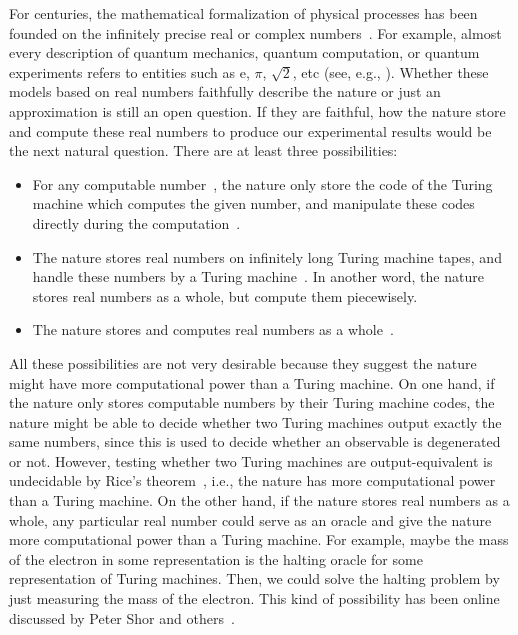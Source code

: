 \documentclass{article}
\theoremstyle{remark}
\newcommand{\rme}{\mathrm{e}}
\begin{document}
For centuries, the mathematical formalization of physical processes
has been founded on the infinitely precise real or complex
numbers~\cite{Ziegler2007,weihrauch2012computable,blum2012complexity}.
For example, almost every description of quantum mechanics, quantum
computation, or quantum experiments refers to entities such as $\rme$,
$\pi$, $\sqrt{2}$, etc (see, e.g.,
\cite{Redhead1987-REDINA,544199,Mermin2007}).  Whether these models
based on real numbers faithfully describe the nature or just an
approximation is still an open question. If they are faithful, how the
nature store and compute these real numbers to produce our
experimental results would be the next natural question.  There are at
least three possibilities:
\begin{itemize}
\item For any computable number~\cite{Turing_1937}, the nature only store
the code of the Turing machine which computes the given number, and
manipulate these codes directly during the computation~\cite{Ziegler2007,weihrauch2012computable}.
\item The nature stores real numbers on infinitely long Turing machine tapes,
and handle these numbers by a Turing machine~\cite{Ziegler2007,weihrauch2012computable}.
In another word, the nature stores real numbers as a whole, but compute
them piecewisely.
\item The nature stores and computes real numbers as a whole~\cite{Ziegler2007,blum2012complexity}.
\end{itemize}
All these possibilities are not very desirable because they suggest
the nature might have more computational power than a Turing machine.
On one hand, if the nature only stores computable numbers by their
Turing machine codes, the nature might be able to decide whether two
Turing machines output exactly the same numbers, since this is used
to decide whether an observable is degenerated or not. However, testing
whether two Turing machines are output-equivalent is undecidable by
Rice's theorem~\cite{Rice_1953,Ziegler2007,weihrauch2012computable},
i.e., the nature has more computational power than a Turing machine.
On the other hand, if the nature stores real numbers as a whole, any
particular real number could serve as an oracle and give the nature
more computational power than a Turing machine. For example, maybe
the mass of the electron in some representation is the halting oracle
for some representation of Turing machines. Then, we could solve the
halting problem by just measuring the mass of the electron. This kind
of possibility has been online discussed by Peter Shor and others~\cite{PhysicsStackExchange16889}.
\end{document}
